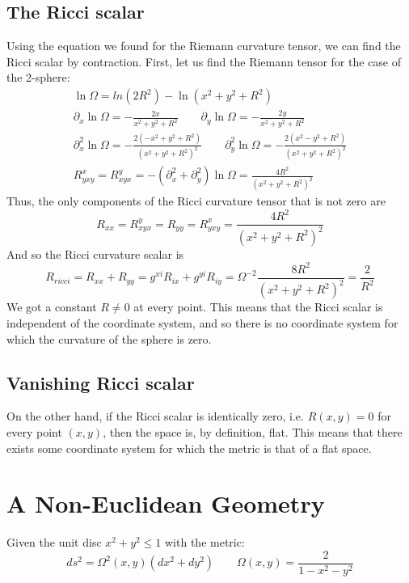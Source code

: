 \documentclass{article}
\begin{document}
\subsection{The Ricci scalar}
Using the equation we found for the Riemann curvature tensor, we can find the Ricci scalar by contraction. First, let us find the Riemann tensor for the case of the 2-sphere:
\begin{equation}
\begin{gathered}
    \ln \Omega = ln(2R^2) - \ln(x^2 + y^2 + R^2) \\
    \partial_x \ln \Omega = -\frac{2x}{x^2 + y^2 + R^2} \qquad
    \partial_y \ln \Omega = -\frac{2y}{x^2 + y^2 + R^2} \\
    \partial_x^2 \ln \Omega = -\frac{2(-x^2 + y^2 + R^2)}{(x^2 + y^2 + R^2)^2} \qquad
    \partial_y^2 \ln \Omega = -\frac{2(x^2 - y^2 + R^2)}{(x^2 + y^2 + R^2)^2} \\
    R^x_{yxy} = R^y_{xyx} = -\left(\partial_x^2 + \partial_y^2\right)\ln \Omega = \frac{4R^2}{(x^2 + y^2 + R^2)^2}
\end{gathered}
\end{equation}
Thus, the only components of the Ricci curvature tensor that is not zero are
\begin{equation}
    R_{xx} = R^y_{xyx} = R_{yy} = R^x_{yxy} = \frac{4R^2}{(x^2 + y^2 + R^2)^2}
\end{equation}
And so the Ricci curvature scalar is
\begin{equation}
    R_{ricci} = R_{xx} + R_{yy} = g^{xi}R_{ix} + g^{yi}R_{iy} = \Omega^{-2}\frac{8R^2}{(x^2 + y^2 + R^2)^2} = \frac{2}{R^2}
\end{equation}
We got a constant $R \ne 0$ at every point. This means that the Ricci scalar is independent of the coordinate system, and so there is no coordinate system for which the curvature of the sphere is zero.
\subsection{Vanishing Ricci scalar}
On the other hand, if the Ricci scalar is identically zero, i.e. $R(x,y) = 0$ for every point $(x,y)$, then the space is, by definition, flat. This means that there exists some coordinate system for which the metric is that of a flat space.

\section{A Non-Euclidean Geometry}
Given the unit disc $x^2 + y^2 \le 1$ with the metric:
\begin{equation}
    ds^2 = \Omega^2(x, y)(dx^2 + dy^2) \qquad \Omega(x, y) = \frac{2}{1 - x^2 - y^2}
\end{equation}
\end{document}
